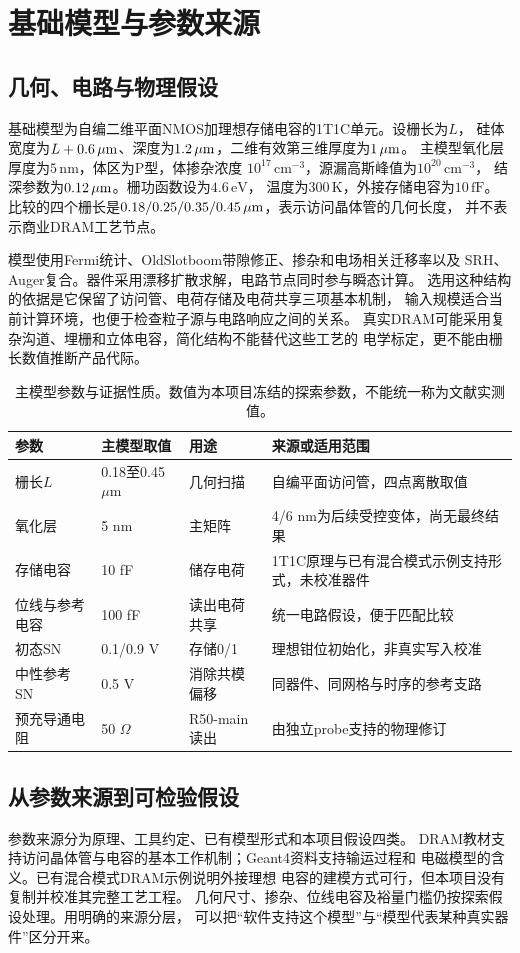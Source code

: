 \section{基础模型与参数来源}
\label{cr:model}
\subsection{几何、电路与物理假设}
基础模型为自编二维平面NMOS加理想存储电容的1T1C单元。设栅长为$L$，
硅体宽度为$L+0.6\,\mu\mathrm{m}$、深度为$1.2\,\mu\mathrm{m}$，二维有效第三维厚度为$1\,\mu\mathrm{m}$。
主模型氧化层厚度为$5\,\mathrm{nm}$，体区为P型，体掺杂浓度
$10^{17}\,\mathrm{cm}^{-3}$，源漏高斯峰值为$10^{20}\,\mathrm{cm}^{-3}$，
结深参数为$0.12\,\mu\mathrm{m}$。栅功函数设为$4.6\,\mathrm{eV}$，
温度为$300\,\mathrm{K}$，外接存储电容为$10\,\mathrm{fF}$。
比较的四个栅长是$0.18/0.25/0.35/0.45\,\mu\mathrm{m}$，表示访问晶体管的几何长度，
并不表示商业DRAM工艺节点。

模型使用Fermi统计、OldSlotboom带隙修正、掺杂和电场相关迁移率以及
SRH、Auger复合。器件采用漂移扩散求解，电路节点同时参与瞬态计算。
选用这种结构的依据是它保留了访问管、电荷存储及电荷共享三项基本机制，
输入规模适合当前计算环境，也便于检查粒子源与电路响应之间的关系。
真实DRAM可能采用复杂沟道、埋栅和立体电容，简化结构不能替代这些工艺的
电学标定，更不能由栅长数值推断产品代际。

\begin{table}[htbp]
\centering\small
\caption{主模型参数与证据性质。数值为本项目冻结的探索参数，不能统一称为文献实测值。}
\label{cr:parameters}
\begin{tabularx}{\textwidth}{lllX}
\toprule
参数&主模型取值&用途&来源或适用范围\\
\midrule
栅长$L$&0.18至0.45 $\mu$m&几何扫描&自编平面访问管，四点离散取值\\
氧化层&5 nm&主矩阵&4/6 nm为后续受控变体，尚无最终结果\\
存储电容&10 fF&储存电荷&1T1C原理与已有混合模式示例支持形式，未校准器件\\
位线与参考电容&100 fF&读出电荷共享&统一电路假设，便于匹配比较\\
初态SN&0.1/0.9 V&存储0/1&理想钳位初始化，非真实写入校准\\
中性参考SN&0.5 V&消除共模偏移&同器件、同网格与时序的参考支路\\
预充导通电阻&50 $\Omega$&R50-main读出&由独立probe支持的物理修订\\
\bottomrule
\end{tabularx}
\end{table}

\subsection{从参数来源到可检验假设}
参数来源分为原理、工具约定、已有模型形式和本项目假设四类。
DRAM教材支持访问晶体管与电容的基本工作机制；Geant4资料支持输运过程和
电磁模型的含义\cite{keeth2001,g4em}。已有混合模式DRAM示例说明外接理想
电容的建模方式可行，但本项目没有复制并校准其完整工艺工程。
几何尺寸、掺杂、位线电容及裕量门槛仍按探索假设处理。用明确的来源分层，
可以把“软件支持这个模型”与“模型代表某种真实器件”区分开来。

